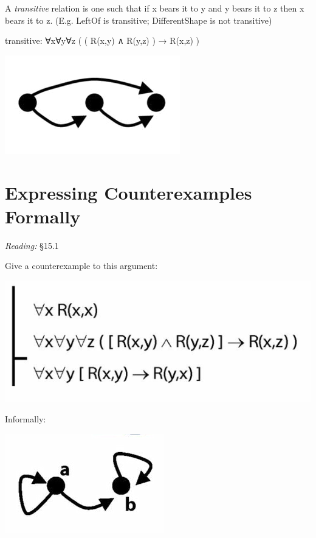 \documentclass[12pt]{extarticle}
\begin{document}
\begin{multicols*}{3}
\begin{minipage}{\columnwidth}
 
A \emph{transitive} relation is one such that if x bears it to y and y bears it to z then x bears it to z. (E.g. LeftOf is transitive; DifferentShape is not transitive)
 
transitive: ∀x∀y∀z ( ( R(x,y) ∧ R(y,z) ) → R(x,z) )
 
\begin{center}
\includegraphics[scale=0.3]{img/transitive.png}
\end{center}
\end{minipage}
 
 
 
\section{Expressing Counterexamples Formally}
 
\emph{Reading:} §15.1
 
Give a counterexample to this argument:
 
\begin{center}
\includegraphics[scale=0.3]{img/unit_583_argument.png}
\end{center}
Informally:
 
\begin{center}
\includegraphics[scale=0.3]{img/unit_583_counterexample.png}
\end{center}


\end{multicols*}
\end{document}
